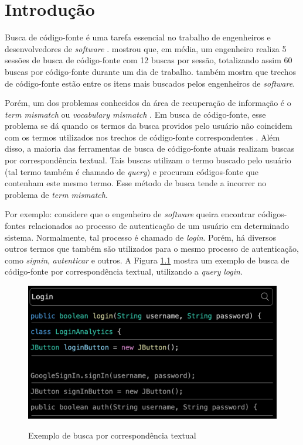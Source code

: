 \chapter{Introdução}
\label{chp:introduction}

Busca de código-fonte é uma tarefa essencial no trabalho de engenheiros e desenvolvedores de \textit{software} \cite{Rahman2018EvaluatingHD}. \textcite{Sadowski2015HowDS} mostrou que, em média, um engenheiro realiza 5 sessões de busca de código-fonte com 12 buscas por sessão, totalizando assim 60 buscas por código-fonte durante um dia de trabalho. \textcite{Xia2017WhatDD} também mostra que trechos de código-fonte estão entre os itens mais buscados pelos engenheiros de \textit{software}.

Porém, um dos problemas conhecidos da área de recuperação de informação é o \textit{term mismatch} ou \textit{vocabulary mismatch} \cite{Furnas1987TheVP} \cite{Carpineto2012ASO}. Em busca de código-fonte, esse problema se dá quando os termos da busca providos pelo usuário não coincidem com os termos utilizados nos trechos de código-fonte correspondentes \cite{Nie2016QueryEB}. Além disso, a maioria das ferramentas de busca de código-fonte atuais realizam buscas por correspondência textual. Tais buscas utilizam o termo buscado pelo usuário (tal termo também é chamado de \textit{query}) e procuram códigos-fonte que contenham este mesmo termo. Esse método de busca tende a incorrer no problema de \textit{term mismatch}.

Por exemplo: considere que o engenheiro de \textit{software} queira encontrar códigos-fontes relacionados ao processo de autenticação de um usuário em determinado sistema. Normalmente, tal processo é chamado de \textit{login}. Porém, há diversos outros termos que também são utilizados para o mesmo processo de autenticação, como \textit{signin}, \textit{autenticar} e outros. A Figura \ref{fig:intro:login-search} mostra um exemplo de busca de código-fonte por correspondência textual, utilizando a \textit{query} \textit{login}.

\begin{figure}[H]
  \centering
  \caption{Exemplo de busca por correspondência textual}
  \includegraphics[width=0.8\columnwidth, height=0.4\columnwidth]{./imagens/intro/login-search.png}
  \label{fig:intro:login-search}
\end{figure}


